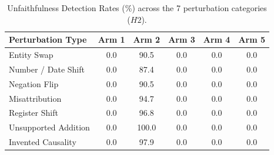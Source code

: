\begin{table}[t]
\centering
\small
\begin{tabular}{lccccc}
\toprule
\textbf{Perturbation Type} & \textbf{Arm 1} & \textbf{Arm 2} & \textbf{Arm 3} & \textbf{Arm 4} & \textbf{Arm 5} \\
\midrule
Entity Swap & 0.0 & 90.5 & 0.0 & 0.0 & 0.0 \\
Number / Date Shift & 0.0 & 87.4 & 0.0 & 0.0 & 0.0 \\
Negation Flip & 0.0 & 90.5 & 0.0 & 0.0 & 0.0 \\
Misattribution & 0.0 & 94.7 & 0.0 & 0.0 & 0.0 \\
Register Shift & 0.0 & 96.8 & 0.0 & 0.0 & 0.0 \\
Unsupported Addition & 0.0 & 100.0 & 0.0 & 0.0 & 0.0 \\
Invented Causality & 0.0 & 97.9 & 0.0 & 0.0 & 0.0 \\
\bottomrule
\end{tabular}
\caption{Unfaithfulness Detection Rates (\%) across the 7 perturbation categories ($H2$).}
\label{tab:perturbation_matrix}
\end{table}